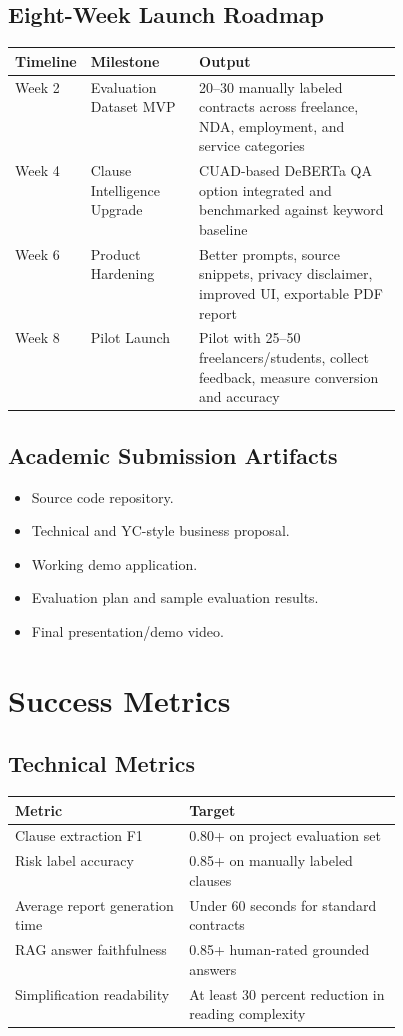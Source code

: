 \documentclass[11pt,a4paper]{article}
\begin{document}
\subsection{Eight-Week Launch Roadmap}

\begin{tabularx}{\linewidth}{L{0.17\linewidth} L{0.28\linewidth} Y}
\toprule
\textbf{Timeline} & \textbf{Milestone} & \textbf{Output} \\
\midrule
Week 2 & Evaluation Dataset MVP & 20--30 manually labeled contracts across freelance, NDA, employment, and service categories \\
Week 4 & Clause Intelligence Upgrade & CUAD-based DeBERTa QA option integrated and benchmarked against keyword baseline \\
Week 6 & Product Hardening & Better prompts, source snippets, privacy disclaimer, improved UI, exportable PDF report \\
Week 8 & Pilot Launch & Pilot with 25--50 freelancers/students, collect feedback, measure conversion and accuracy \\
\bottomrule
\end{tabularx}

\subsection{Academic Submission Artifacts}

\begin{itemize}
\item Source code repository.
\item Technical and YC-style business proposal.
\item Working demo application.
\item Evaluation plan and sample evaluation results.
\item Final presentation/demo video.
\end{itemize}

\section{Success Metrics}

\subsection{Technical Metrics}

\begin{tabularx}{\linewidth}{L{0.45\linewidth}Y}
\toprule
\textbf{Metric} & \textbf{Target} \\
\midrule
Clause extraction F1 & 0.80+ on project evaluation set \\
Risk label accuracy & 0.85+ on manually labeled clauses \\
Average report generation time & Under 60 seconds for standard contracts \\
RAG answer faithfulness & 0.85+ human-rated grounded answers \\
Simplification readability & At least 30 percent reduction in reading complexity \\
\bottomrule
\end{tabularx}
\end{document}
